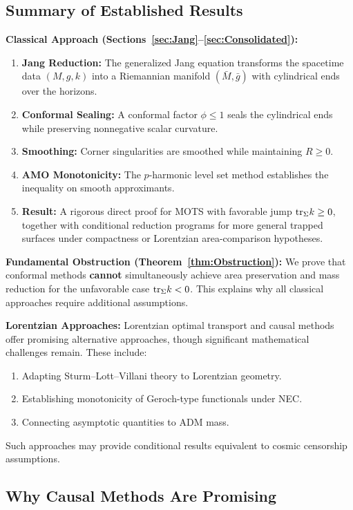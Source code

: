 \subsection{Summary of Established Results}

\textbf{Classical Approach (Sections~\ref{sec:Jang}--\ref{sec:Consolidated}):}
\begin{enumerate}
    \item \textbf{Jang Reduction:} The generalized Jang equation transforms the spacetime data $(M,g,k)$ into a Riemannian manifold $(\bar{M}, \bar{g})$ with cylindrical ends over the horizons.
    \item \textbf{Conformal Sealing:} A conformal factor $\phi \le 1$ seals the cylindrical ends while preserving nonnegative scalar curvature.
    \item \textbf{Smoothing:} Corner singularities are smoothed while maintaining $R \ge 0$.
    \item \textbf{AMO Monotonicity:} The $p$-harmonic level set method establishes the inequality on smooth approximants.
    \item \textbf{Result:} A rigorous direct proof for MOTS with favorable jump $\mathrm{tr}_\Sigma k \ge 0$, together with conditional reduction programs for more general trapped surfaces under compactness or Lorentzian area-comparison hypotheses.
\end{enumerate}

\textbf{Fundamental Obstruction (Theorem~\ref{thm:Obstruction}):}
We prove that conformal methods \textbf{cannot} simultaneously achieve area preservation and mass reduction for the unfavorable case $\mathrm{tr}_\Sigma k < 0$. This explains why all classical approaches require additional assumptions.

\textbf{Lorentzian Approaches:}
Lorentzian optimal transport and causal methods offer promising alternative approaches, though significant mathematical challenges remain. These include:
\begin{enumerate}
    \item Adapting Sturm--Lott--Villani theory to Lorentzian geometry.
    \item Establishing monotonicity of Geroch-type functionals under NEC.
    \item Connecting asymptotic quantities to ADM mass.
\end{enumerate}
Such approaches may provide conditional results equivalent to cosmic censorship assumptions.

\subsection{Why Causal Methods Are Promising}

